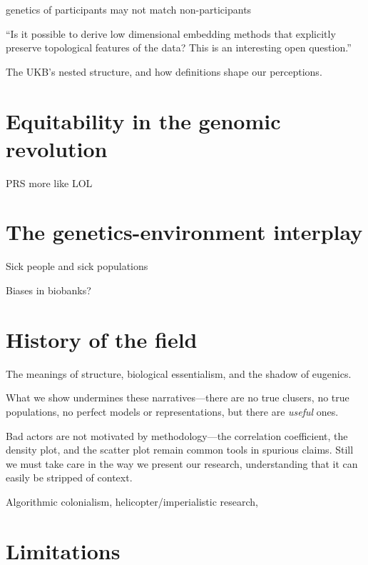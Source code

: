 genetics of participants may not match non-participants
\citep{benonisdottir_studying_2023}

``Is it possible to derive low dimensional embedding methods that explicitly preserve topological features of the data? This is an interesting open question.''\citep{wasserman_topological_2018}

The UKB's nested structure, and how definitions shape our perceptions.

\section{Equitability in the genomic revolution}

PRS more like LOL\citep{kaplan_polygenic_2022}

\section{The genetics-environment interplay}

Sick people and sick populations\citep{rose_sick_2001}

Biases in biobanks?

\section{History of the field}

The meanings of structure, biological essentialism, and the shadow of eugenics.

What we show undermines these narratives---there are no true clusers, no true populations, no perfect models or representations, but there are \textit{useful} ones.

Bad actors are not motivated by methodology---the correlation coefficient, the density plot, and the scatter plot remain common tools in spurious claims. Still we must take care in the way we present our research, understanding that it can easily be stripped of context.

Algorithmic colonialism, helicopter/imperialistic research, 

\section{Limitations}

